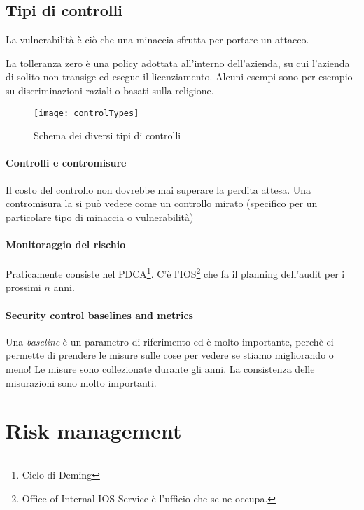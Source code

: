 \subsection{Tipi di controlli}

La vulnerabilità è ciò che una minaccia sfrutta per portare un attacco.


La tolleranza zero è una policy adottata all'interno dell'azienda, su cui
l'azienda di solito non transige ed esegue il licenziamento. Alcuni esempi sono
per esempio su discriminazioni raziali o basati sulla religione.

\begin{figure}[H]
 \centering
 \texttt{[image: controlTypes]}
 \caption{Schema dei diversi tipi di controlli}
\end{figure}



\paragraph*{Controlli e contromisure}

Il costo del controllo non dovrebbe mai superare la perdita attesa.
Una contromisura la si può vedere come un controllo mirato (specifico per un
particolare tipo di minaccia o vulnerabilità)

\paragraph*{Monitoraggio del rischio}

Praticamente consiste nel PDCA\footnote{Ciclo di Deming}.
C'è l'IOS\footnote{Office of Internal IOS Service è l'ufficio che se ne occupa.}
che fa il planning dell'audit per i prossimi $n$ anni.


\paragraph*{Security control baselines and metrics}

Una \textit{baseline} è un parametro di riferimento ed è molto importante,
perchè ci permette di prendere le misure sulle cose per vedere se stiamo
migliorando o meno!
Le misure sono collezionate durante gli anni. La consistenza delle misurazioni
sono molto importanti.

\section{Risk management}

